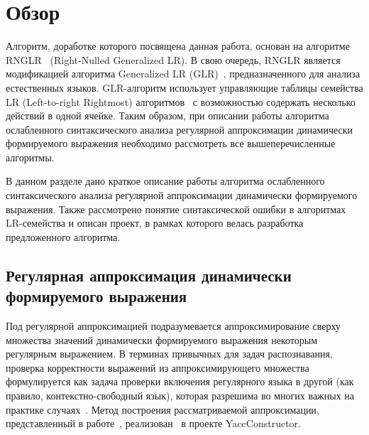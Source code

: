 \clearpage
\setmonofont[Mapping=tex-text]{CMU Typewriter Text}
\section{Обзор}
Алгоритм, доработке которого посвящена данная работа, основан на алгоритме RNGLR~\cite{RNGLR} (Right-Nulled Generalized LR). В свою очередь, RNGLR является модификацией алгоритма Generalized LR (GLR)~\cite{Tomita}, предназначенного для анализа естественных языков. GLR-алгоритм использует управляющие таблицы семейства LR (Left-to-right Rightmost) алгоритмов~\cite{Grune} с возможностью содержать несколько действий в одной ячейке. Таким образом, при описании работы алгоритма ослабленного синтаксического анализа регулярной аппроксимации динамически формируемого выражения необходимо рассмотреть все вышеперечисленные алгоритмы.

В данном разделе дано краткое описание работы алгоритма ослабленного синтаксического анализа регулярной аппроксимации динамически формируемого выражения. Также рассмотрено понятие синтаксической ошибки в алгоритмах LR-семейства и описан проект, в рамках которого велась разработка предложенного алгоритма.

\subsection{Регулярная аппроксимация динамически формируемого выражения}
Под регулярной аппроксимацией подразумевается аппроксимирование сверху множества значений динамически формируемого выражения некоторым регулярным выражением. В терминах привычных для задач распознавания, проверка корректности выражений из аппроксимирующего множества формулируется как задача проверки включения регулярного языка в другой (как правило, контекстно-свободный язык), которая разрешима во многих важных на практике случаях~\cite{LangInclusion}. Метод построения рассматриваемой аппроксимации, представленный в работе~\cite{RegOverApprox}, реализован~\cite{YCregapprox} в проекте YaccConstructor.

